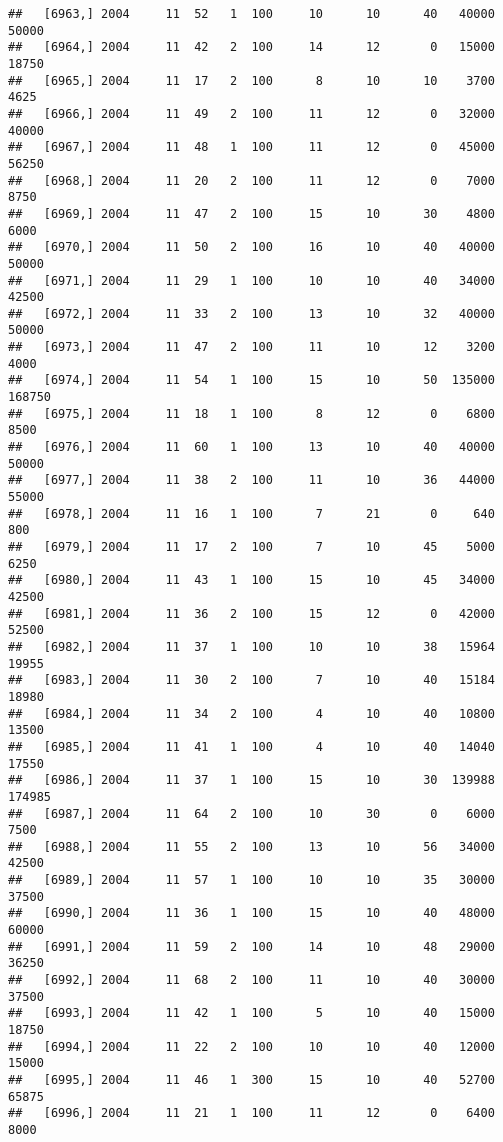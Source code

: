 \documentclass{article}\usepackage[]{graphicx}\usepackage[]{color}
\makeatletter
\newenvironment{kframe}{%
 \def\at@end@of@kframe{}%
 \ifinner\ifhmode%
  \def\at@end@of@kframe{\end{minipage}}%
  \begin{minipage}{\columnwidth}%
 \fi\fi%
 \def\FrameCommand##1{\hskip\@totalleftmargin \hskip-\fboxsep
 \colorbox{shadecolor}{##1}\hskip-\fboxsep
     \hskip-\linewidth \hskip-\@totalleftmargin \hskip\columnwidth}%
 \MakeFramed {\advance\hsize-\width
   \@totalleftmargin\z@ \linewidth\hsize
   \@setminipage}}%
 {\par\unskip\endMakeFramed%
 \at@end@of@kframe}
\newenvironment{knitrout}{}{} %
\makeatother
\begin{document}
\begin{knitrout}
\begin{kframe}
\begin{verbatim}
##   [6963,] 2004     11  52   1  100     10      10      40   40000   50000
##   [6964,] 2004     11  42   2  100     14      12       0   15000   18750
##   [6965,] 2004     11  17   2  100      8      10      10    3700    4625
##   [6966,] 2004     11  49   2  100     11      12       0   32000   40000
##   [6967,] 2004     11  48   1  100     11      12       0   45000   56250
##   [6968,] 2004     11  20   2  100     11      12       0    7000    8750
##   [6969,] 2004     11  47   2  100     15      10      30    4800    6000
##   [6970,] 2004     11  50   2  100     16      10      40   40000   50000
##   [6971,] 2004     11  29   1  100     10      10      40   34000   42500
##   [6972,] 2004     11  33   2  100     13      10      32   40000   50000
##   [6973,] 2004     11  47   2  100     11      10      12    3200    4000
##   [6974,] 2004     11  54   1  100     15      10      50  135000  168750
##   [6975,] 2004     11  18   1  100      8      12       0    6800    8500
##   [6976,] 2004     11  60   1  100     13      10      40   40000   50000
##   [6977,] 2004     11  38   2  100     11      10      36   44000   55000
##   [6978,] 2004     11  16   1  100      7      21       0     640     800
##   [6979,] 2004     11  17   2  100      7      10      45    5000    6250
##   [6980,] 2004     11  43   1  100     15      10      45   34000   42500
##   [6981,] 2004     11  36   2  100     15      12       0   42000   52500
##   [6982,] 2004     11  37   1  100     10      10      38   15964   19955
##   [6983,] 2004     11  30   2  100      7      10      40   15184   18980
##   [6984,] 2004     11  34   2  100      4      10      40   10800   13500
##   [6985,] 2004     11  41   1  100      4      10      40   14040   17550
##   [6986,] 2004     11  37   1  100     15      10      30  139988  174985
##   [6987,] 2004     11  64   2  100     10      30       0    6000    7500
##   [6988,] 2004     11  55   2  100     13      10      56   34000   42500
##   [6989,] 2004     11  57   1  100     10      10      35   30000   37500
##   [6990,] 2004     11  36   1  100     15      10      40   48000   60000
##   [6991,] 2004     11  59   2  100     14      10      48   29000   36250
##   [6992,] 2004     11  68   2  100     11      10      40   30000   37500
##   [6993,] 2004     11  42   1  100      5      10      40   15000   18750
##   [6994,] 2004     11  22   2  100     10      10      40   12000   15000
##   [6995,] 2004     11  46   1  300     15      10      40   52700   65875
##   [6996,] 2004     11  21   1  100     11      12       0    6400    8000

\end{verbatim}
\end{kframe}
\end{knitrout}
\end{document}
